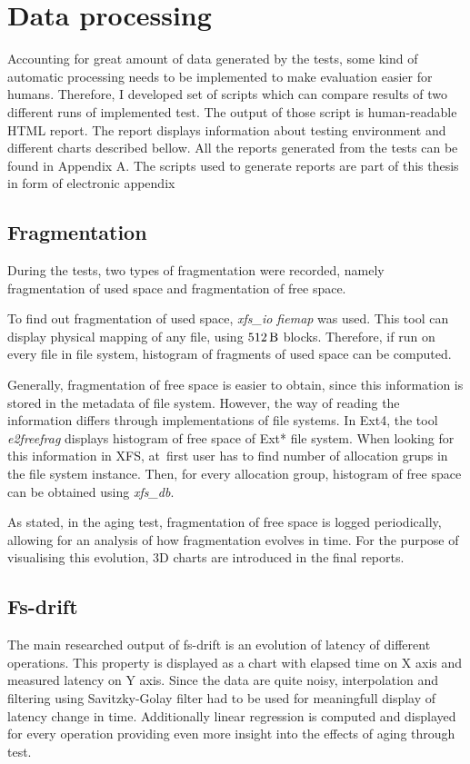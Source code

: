 \documentclass[
  color, %
  table, %
  lof,   %
  lot,   %
]{fithesis3}
\begin{document}
\section{Data processing}
Accounting for great amount of data generated by the tests, some kind of automatic processing needs to be implemented to make evaluation easier for humans. Therefore, I developed set of scripts which can compare results of two different runs of implemented test. The output of those script is human-readable HTML report. The report displays information about testing environment and different charts described bellow. All the reports generated from the tests can be found in Appendix A. The scripts used to generate reports are part of this thesis in form of electronic appendix

\subsection{Fragmentation}
During the tests, two types of fragmentation were recorded, namely fragmentation of used space and fragmentation of free space.

To find out fragmentation of used space, \textit{xfs\_io fiemap} was used. This tool can display physical mapping of any file, using $\SI{512}{\byte}$ blocks. Therefore, if run on every file in file system, histogram of fragments of used space can be computed.

Generally, fragmentation of free space is easier to obtain, since this information is stored in the metadata of file system. However, the way of reading the information differs through implementations of file systems. In Ext4, the tool \textit{e2freefrag} displays histogram of free space of Ext* file system. When looking for this information in XFS, at~first user has to find number of allocation grups in the file system instance. Then, for every allocation group, histogram of free space can be obtained using \textit{xfs\_db}.

As stated, in the aging test, fragmentation of free space is logged periodically, allowing for an analysis of how fragmentation evolves in time. For the purpose of visualising this evolution, 3D charts are introduced in the final reports.

\subsection{Fs-drift}
The main researched output of fs-drift is an evolution of latency of different operations. This property is displayed as a chart with elapsed time on X axis and measured latency on Y axis. Since the data are quite noisy, interpolation and filtering using Savitzky-Golay filter had to be used for meaningfull display of latency change in time. Additionally linear regression is computed and displayed for every operation providing even more insight into the effects of aging through test.
\end{document}
